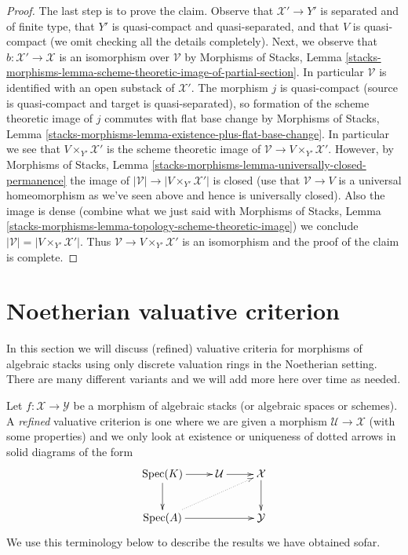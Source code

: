 \documentclass{stacks-project}
\theoremstyle{plain}
\theoremstyle{definition}
\theoremstyle{remark}
\numberwithin{equation}{subsection}
\def\Spec{\mathop{\mathrm{Spec}}}
\begin{document}
\begin{proof}
\medskip\noindent
The last step is to prove the claim.
Observe that $\mathcal{X}' \to Y'$ is separated and of finite type,
that $Y'$ is quasi-compact and quasi-separated, and that $V$ is quasi-compact
(we omit checking all the details completely).
Next, we observe that
$b : \mathcal{X}' \to \mathcal{X}$ is an isomorphism over
$\mathcal{V}$ by Morphisms of Stacks, Lemma
\ref{stacks-morphisms-lemma-scheme-theoretic-image-of-partial-section}.
In particular $\mathcal{V}$ is identified with an open substack
of $\mathcal{X}'$.
The morphism $j$ is quasi-compact
(source is quasi-compact and target is quasi-separated), so formation
of the scheme theoretic image of $j$ commutes with flat base change by
Morphisms of Stacks, Lemma
\ref{stacks-morphisms-lemma-existence-plus-flat-base-change}.
In particular we see that $V \times_{Y'} \mathcal{X}'$ is the
scheme theoretic image of
$\mathcal{V} \to V \times_{Y'} \mathcal{X}'$.
However, by Morphisms of Stacks, Lemma
\ref{stacks-morphisms-lemma-universally-closed-permanence}
the image of $|\mathcal{V}| \to |V \times_{Y'} \mathcal{X}'|$
is closed (use that $\mathcal{V} \to V$ is a universal homeomorphism
as we've seen above and hence is universally closed).
Also the image is dense (combine what we just said with
Morphisms of Stacks, Lemma
\ref{stacks-morphisms-lemma-topology-scheme-theoretic-image})
we conclude $|\mathcal{V}| = |V \times_{Y'} \mathcal{X}'|$.
Thus $\mathcal{V} \to V \times_{Y'} \mathcal{X}'$ is an
isomorphism and the proof of the claim is complete.
\end{proof}




\section{Noetherian valuative criterion}
\label{section-Noetherian-valuative-criterion}

\noindent
In this section we will discuss (refined) valuative criteria for
morphisms of algebraic stacks using only discrete valuation rings
in the Noetherian setting. There are many different variants
and we will add more here over time as needed.

\medskip\noindent
Let $f : \mathcal{X} \to \mathcal{Y}$ be a morphism of algebraic stacks
(or algebraic spaces or schemes). A {\it refined} valuative criterion
is one where we are given a morphism $\mathcal{U} \to \mathcal{X}$
(with some properties) and we only look at existence or uniqueness
of dotted arrows in solid diagrams of the form
$$
\xymatrix{
\Spec(K) \ar[d] \ar[r] & \mathcal{U} \ar[r] & \mathcal{X} \ar[d] \\
\Spec(A) \ar[rr] \ar@{..>}[rru] & & \mathcal{Y}
}
$$
We use this terminology below to describe the results we have obtained sofar.
\end{document}
